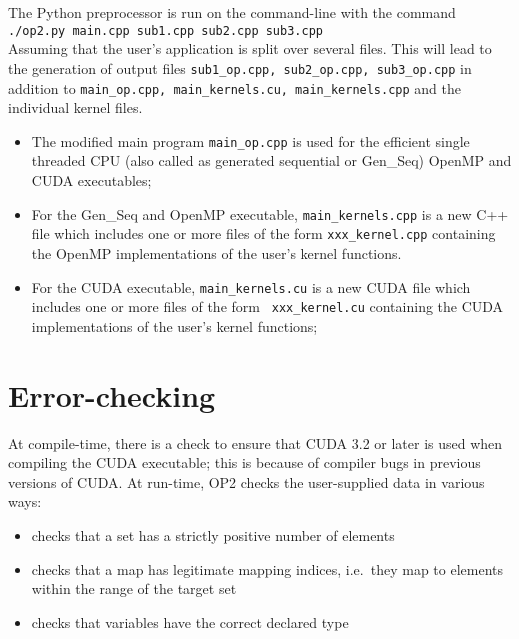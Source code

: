 \documentclass[11pt]{article}
\begin{document}
The Python preprocessor is run on the command-line with the command\\

{\tt ./op2.py main.cpp sub1.cpp sub2.cpp sub3.cpp}\\

\noindent Assuming that the user's application is split over several files. This will lead to the generation of output
files {\tt sub1\_op.cpp, sub2\_op.cpp, sub3\_op.cpp} in addition to {\tt main\_op.cpp, main\_kernels.cu,
main\_kernels.cpp} and the individual kernel files.

\begin{itemize}
\item
The modified main program {\tt main\_op.cpp} is used for the efficient single threaded CPU (also called as
generated sequential or Gen\_Seq) OpenMP and CUDA executables;

\item
For the Gen\_Seq and OpenMP executable, {\tt main\_kernels.cpp} is a new C++ file which includes one or more files of
the form {\tt xxx\_kernel.cpp} containing the OpenMP implementations of the user's kernel functions.

\item
For the CUDA executable, {\tt main\_kernels.cu} is a new CUDA file which includes one or more files of the form {\tt
xxx\_kernel.cu} containing the CUDA implementations of the user's kernel functions;

\end{itemize}



\section{Error-checking}

At compile-time, there is a check to ensure that CUDA 3.2 or later is used
when compiling the CUDA executable; this is because of compiler bugs in previous
versions of CUDA. At run-time, OP2 checks the user-supplied data in various ways:
\begin{itemize}
\item
checks that a set has a strictly positive number of elements
\item
checks that a map has legitimate mapping indices,
i.e.~they map to elements within the range of the target set
\item
checks that variables have the correct declared type
\end{itemize}
\end{document}
